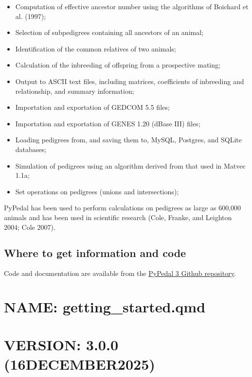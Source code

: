 \documentclass[
  letterpaper,
  DIV=11,
  numbers=noendperiod]{scrreprt}
\begin{document}
\begin{itemize}
  algorithm of Boichard et al. (1997);
\item
  Computation of effective ancestor number using the algorithms of
  Boichard et al. (1997);
\item
  Selection of subpedigrees containing all ancestors of an animal;
\item
  Identification of the common relatives of two animals;
\item
  Calculation of the inbreeding of offspring from a prospective mating;
\item
  Output to ASCII text files, including matrices, coefficients of
  inbreeding and relationship, and summary information;
\item
  Importation and exportation of GEDCOM 5.5 files;
\item
  Importation and exportation of GENES 1.20 (dBase III) files;
\item
  Loading pedigrees from, and saving them to, MySQL, Postgres, and
  SQLite databases;
\item
  Simulation of pedigrees using an algorithm derived from that used in
  Matvec 1.1a;
\item
  Set operations on pedigrees (unions and intersections);
\end{itemize}

PyPedal has been used to perform calculations on pedigrees as large as
600,000 animals and has been used in scientific research (Cole, Franke,
and Leighton 2004; Cole 2007).

\section{Where to get information and
code}\label{where-to-get-information-and-code}

Code and documentation are available from the
\href{https://github.com/wintermind/pypedal3}{PyPedal 3 Github
repository}.


\chapter{NAME: getting\_started.qmd}\label{name-getting_started.qmd}


\chapter{VERSION: 3.0.0
(16DECEMBER2025)}\label{version-3.0.0-16december2025}
\end{document}
